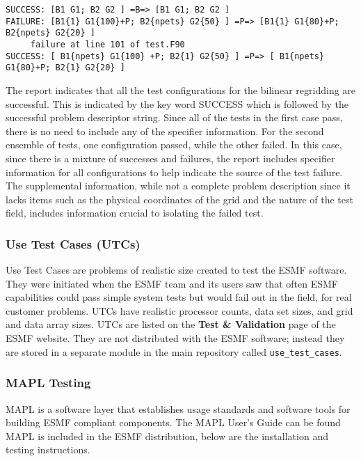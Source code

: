 \begin{verbatim}
SUCCESS: [B1 G1; B2 G2 ] =B=> [B1 G1; B2 G2 ] 
FAILURE: [B1{1} G1{100}+P; B2{npets} G2{50} ] =P=> [B1{1} G1{80}+P; B2{npets} G2{20} ] 
     failure at line 101 of test.F90
SUCCESS: [ B1{npets} G1{100} +P; B2{1} G2{50} ] =P=> [ B1{npets} G1{80}+P; B2{1} G2{20} ] 
\end{verbatim}

The report indicates that all the test configurations for the bilinear regridding
are successful. This is indicated by the key word SUCCESS which is followed by the 
successful problem descriptor string. Since all of the tests in the first case pass,
there is no need to include any of the specifier information. For the second
ensemble of tests, one configuration passed, while the other failed. In this case,
since there is a mixture of successes and failures, the report includes 
specifier information for all configurations to help indicate the source of the
test failure. The supplemental information, while not a complete problem description
since it lacks items such as the physical coordinates of the grid and the nature of 
the test field, includes information crucial to isolating the failed test.


\subsubsection{Use Test Cases (UTCs)}

Use Test Cases are problems of realistic size created to test the ESMF
software.  They were initiated when the ESMF team and its users saw that
often ESMF capabilities could pass simple system tests but would fail
out in the field, for real customer problems.  UTCs have realistic
processor counts, data set sizes, and grid and data array sizes.  UTCs are
listed on the {\bf Test \& Validation} page of the ESMF website.  They
are not distributed with the ESMF software; instead they are stored in
a separate module in the main repository called {\tt use\_test\_cases}.

\subsubsection{MAPL Testing}

MAPL is a software layer that establishes usage standards and software
tools for building ESMF compliant components. The MAPL User's Guide can be found
MAPL is included in the ESMF distribution, below are the installation and testing instructions.

